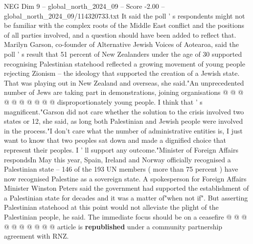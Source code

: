 \begin{textsample}{NEG Dim 9 – global\_north\_2024\_09 – Score -2.00 – global\_north\_2024\_09/114320733.txt}
It said the poll ' s respondents might not be familiar with the complex roots of the Middle East conflict and the positions of all parties involved, and a question should have been added to reflect that.
Marilyn Garson, co-founder of Alternative Jewish Voices of Aotearoa, said the poll ' s result that 51 percent of New Zealanders under the age of 30 supported recognising Palestinian statehood reflected a growing movement of young people rejecting Zionism -- the ideology that supported the creation of a Jewish state.
That was playing out in New Zealand and overseas, she said."An unprecedented number of Jews are taking part in demonstrations, joining organisations @ @ @ @ @ @ @ @ @ @ disproportionately young people.
I think that ' s magnificent."Garson did not care whether the solution to the crisis involved two states or 12, she said, as long both Palestinian and Jewish people were involved in the process."I don't care what the number of administrative entities is, I just want to know that two peoples sat down and made a dignified choice that represent their peoples.
I ' ll support any outcome."Minister of Foreign Affairs respondsIn May this year, Spain, Ireland and Norway officially recognised a Palestinian state -- 146 of the 193 UN members ( more than 75 percent ) have now recognised Palestine as a sovereign state.
A spokesperson for Foreign Affairs Minister Winston Peters said the government had supported the establishment of a Palestinian state for decades and it was a matter of"when not if".
But asserting Palestinian statehood at this point would not alleviate the plight of the Palestinian people, he said.
The immediate focus should be on a ceasefire @ @ @ @ @ @ @ @ @ @ article is \textbf{republished} under a community partnership agreement with RNZ.

\end{textsample}
